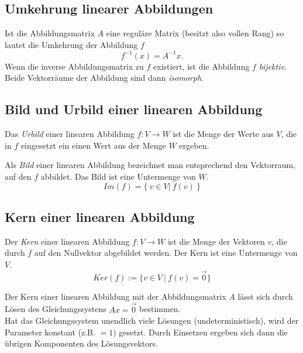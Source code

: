 \subsection{Umkehrung linearer Abbildungen}
\label{sub:umkehrung_linearer_abbildungen}

Ist die Abbildungsmatrix $A$ eine reguläre Matrix (besitzt also vollen Rang) so lautet die Umkehrung der Abbildung $f$
\begin{equation}
	f^{-1}(x) = A^{-1}x.
\end{equation}
Wenn die inverse Abbildungsmatrix zu $f$ existiert, ist die Abbildung $f$ \emph{bijektiv}. Beide Vektorräume der 
Abbildung sind dann \emph{isomorph}.

\subsection{Bild und Urbild einer linearen Abbildung}
\label{sub:bild_und_urbild_einer_linearen_abbildung}

Das \emph{Urbild} einer linearen Abbildung $f : V \rightarrow W$ ist die Menge der Werte aus $V$, die in $f$ eingesetzt
ein einen Wert aus der Menge $W$ ergeben.

Als \emph{Bild} einer linearen Abbildung bezeichnet man entsprechend den Vektorraum, auf den $f$ abbildet. 
Das Bild ist eine Untermenge von $W$.
\begin{equation}
	Im(f) = \{ \: v \in V | \: f(v) \:  \}
\end{equation}

\subsection{Kern einer linearen Abbildung} 
\label{sub:kern_einer_linearen_abbildung}

Der \emph{Kern} einer linearen Abbildung $f : V \rightarrow W$ ist die Menge der Vektoren $v$, die durch $f$ auf den 
Nullvektor abgebildet werden. Der Kern ist eine Untermenge von $V$.
\begin{equation}
	Ker(f) := \{v \in V \: | \: f(v) = \overrightarrow{0}\}
\end{equation}

Der Kern einer linearen Abbildung mit der Abbildungsmatrix $A$ lässt sich durch Lösen des 
Gleichungssystens $Ax = \overrightarrow{0}$ bestimmen. \\
Hat das Gleichungssystem unendlich viele Lösungen
(undeterministisch), wird der Parameter konstant (z.B. $=1$) gesetzt. Durch Einsetzen ergeben sich dann die
übrigen Komponenten des Lösungsvektors.

